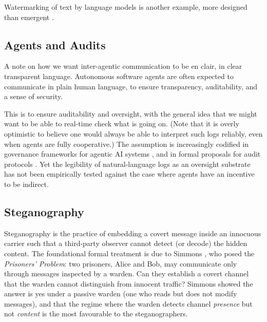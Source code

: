 \documentclass{article}
\begin{document}
Watermarking of text by language models is another example, more
designed than emergent \cite{kirchenbauer2023watermark}.


\subsection{Agents and Audits}

A note on how we want inter-agentic communication to be en clair, in
clear transparent language. Autonomous software agents are often
expected to communicate in plain human language, to ensure
transparency, auditability, and a sense of security.

This is to ensure auditability and oversight, with the general idea
that we might want to be able to real-time check what is going on.
(Note that it is overly optimistic to believe one would always be
able to interpret such logs reliably, even when agents are fully
cooperative.) The assumption is increasingly codified in governance
frameworks for agentic AI systems \cite{governing2025,hammond2025},
and in formal proposals for audit protocols \cite{who_audits2025}.
Yet the legibility of natural-language logs as an oversight substrate
has not been empirically tested against the case where agents have
an incentive to be indirect.

\subsection{Steganography}

Steganography is the practice of embedding a covert message inside
an innocuous carrier such that a third-party observer cannot detect
(or decode) the hidden content. The foundational formal treatment is
due to Simmons , who posed the
\textit{Prisoners' Problem}: two prisoners, Alice and Bob, may
communicate only through messages inspected by a warden.
Can they establish a covert channel that the warden cannot distinguish
from innocent traffic? Simmons showed the answer is yes under a
passive warden (one who reads but does not modify messages), and that
the regime where the warden detects channel \textit{presence} but not
\textit{content} is the most favourable to the steganographers.
\end{document}
